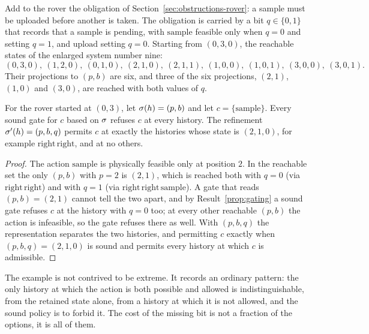 Add to the rover the obligation of Section~\ref{sec:obstructions-rover}: a sample must be uploaded before another is taken. The obligation is carried by a bit $q\in\{0,1\}$ that records that a sample is pending, with $\mathrm{sample}$ feasible only when $q=0$ and setting $q=1$, and $\mathrm{upload}$ setting $q=0$. Starting from $(0,3,0)$, the reachable states of the enlarged system number nine:
\[
(0,3,0),\ (1,2,0),\ (0,1,0),\ (2,1,0),\ (2,1,1),\ (1,0,0),\ (1,0,1),\ (3,0,0),\ (3,0,1).
\]
Their projections to $(p,b)$ are six, and three of the six projections, $(2,1)$, $(1,0)$ and $(3,0)$, are reached with both values of $q$.

\begin{newresult}\label{prop:rover-gate}
For the rover started at $(0,3)$, let $\sigma(h)=(p,b)$ and let $c=\{\mathrm{sample}\}$. Every sound gate for $c$ based on $\sigma$ refuses $c$ at every history. The refinement $\sigma'(h)=(p,b,q)$ permits $c$ at exactly the histories whose state is $(2,1,0)$, for example $\mathrm{right}\,\mathrm{right}$, and at no others.
\end{newresult}
\begin{proof}
The action $\mathrm{sample}$ is physically feasible only at position $2$. In the reachable set the only $(p,b)$ with $p=2$ is $(2,1)$, which is reached both with $q=0$ (via $\mathrm{right}\,\mathrm{right}$) and with $q=1$ (via $\mathrm{right}\,\mathrm{right}\,\mathrm{sample}$). A gate that reads $(p,b)=(2,1)$ cannot tell the two apart, and by Result~\ref{prop:gating} a sound gate refuses $c$ at the history with $q=0$ too; at every other reachable $(p,b)$ the action is infeasible, so the gate refuses there as well. With $(p,b,q)$ the representation separates the two histories, and permitting $c$ exactly when $(p,b,q)=(2,1,0)$ is sound and permits every history at which $c$ is admissible.
\end{proof}

The example is not contrived to be extreme. It records an ordinary pattern: the only history at which the action is both possible and allowed is indistinguishable, from the retained state alone, from a history at which it is not allowed, and the sound policy is to forbid it. The cost of the missing bit is not a fraction of the options, it is all of them.

